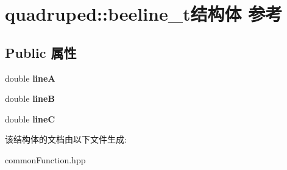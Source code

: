\hypertarget{structquadruped_1_1beeline__t}{}\section{quadruped\+:\+:beeline\+\_\+t结构体 参考}
\label{structquadruped_1_1beeline__t}
\subsection*{Public 属性}
\begin{DoxyCompactItemize}
\item 
\mbox{\label{structquadruped_1_1beeline__t_a9e55c80a52a849aed52d9f7f73b5137d}} 
double {\bfseries lineA}
\item 
\mbox{\label{structquadruped_1_1beeline__t_a79b045fab2daa43d0472892443e2681e}} 
double {\bfseries lineB}
\item 
\mbox{\label{structquadruped_1_1beeline__t_a20f2a84a38b0091ae0ad20bed94b1aa6}} 
double {\bfseries lineC}
\end{DoxyCompactItemize}


该结构体的文档由以下文件生成\+:\begin{DoxyCompactItemize}
\item 
common\+Function.\+hpp\end{DoxyCompactItemize}

